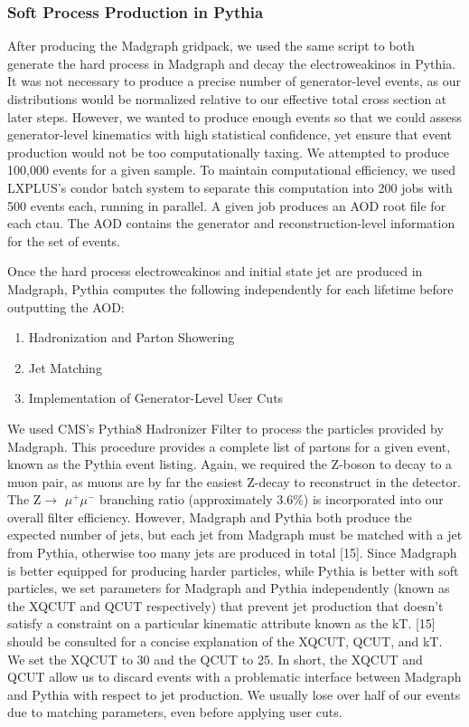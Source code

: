 \documentclass{article}
\begin{document}
\subsubsection{Soft Process Production in Pythia}
After producing the Madgraph gridpack, we used the same script to both generate the hard process in Madgraph and decay the electroweakinos in Pythia. It was not necessary to produce a precise number of generator-level events, as our distributions would be normalized relative to our effective total cross section at later steps. However, we wanted to produce enough events so that we could assess generator-level kinematics with high statistical confidence, yet ensure that event production would not be too computationally taxing. We attempted to produce 100,000 events for a given sample. To maintain computational efficiency, we used LXPLUS's condor batch system to separate this computation into 200 jobs with 500 events each, running in parallel. A given job produces an AOD root file for each ctau. The AOD contains the generator and reconstruction-level information for the set of events.
\par
Once the hard process electroweakinos and initial state jet are produced in Madgraph, Pythia computes the following independently for each lifetime before outputting the AOD:
\begin{enumerate}
    \item Hadronization and Parton Showering
    \item Jet Matching
    \item Implementation of Generator-Level User Cuts
\end{enumerate}
\par
We used CMS's Pythia8 Hadronizer Filter to process the particles provided by Madgraph. This procedure provides a complete list of partons for a given event, known as the Pythia event listing. Again, we required the Z-boson to decay to a muon pair, as muons are by far the easiest Z-decay to reconstruct in the detector. The Z$\rightarrow$ $\mu^{+}\mu^{-}$ branching ratio (approximately 3.6\%) is incorporated into our overall filter efficiency. However, Madgraph and Pythia both produce the expected number of jets, but each jet from Madgraph must be matched with a jet from Pythia, otherwise too many jets are produced in total [15]. Since Madgraph is better equipped for producing harder particles, while Pythia is better with soft particles, we set parameters for Madgraph and Pythia independently (known as the XQCUT and QCUT respectively) that prevent jet production that doesn't satisfy a constraint on a particular kinematic attribute known as the kT. [15] should be consulted for a concise explanation of the XQCUT, QCUT, and kT. We set the XQCUT to 30 and the QCUT to 25. In short, the XQCUT and QCUT allow us to discard events with a problematic interface between Madgraph and Pythia with respect to jet production. We usually lose over half of our events due to matching parameters, even before applying user cuts.
\end{document}
